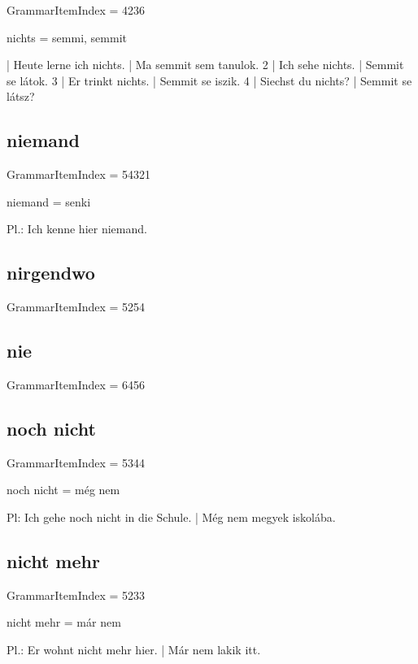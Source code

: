 \documentclass{article}
\newenvironment{desc}{\verbatim}{\endverbatim}
\newenvironment{exmp}{\verbatim}{\endverbatim}
\begin{document}
GrammarItemIndex = 4236

\begin{desc}
nichts = semmi, semmit
\end{desc}

\begin{exmp}
1 | Heute lerne ich nichts. | Ma semmit sem tanulok.
2 | Ich sehe nichts. | Semmit se látok.
3 | Er trinkt nichts. | Semmit se iszik.
4 | Siechst du nichts? | Semmit se látsz?
\end{exmp}

\subsection{niemand}

GrammarItemIndex = 54321

\begin{desc}
niemand = senki

Pl.: Ich kenne hier niemand.
\end{desc}

\subsection{nirgendwo}

GrammarItemIndex = 5254

\subsection{nie}

GrammarItemIndex = 6456

\subsection{noch nicht}

GrammarItemIndex = 5344

\begin{desc}
noch nicht = még nem

Pl: Ich gehe noch nicht in die Schule. | Még nem megyek iskolába.
\end{desc}

\subsection{nicht mehr}

GrammarItemIndex = 5233

\begin{desc}
nicht mehr = már nem

Pl.: Er wohnt nicht mehr hier. | Már nem lakik itt.
\end{desc}
\end{document}
